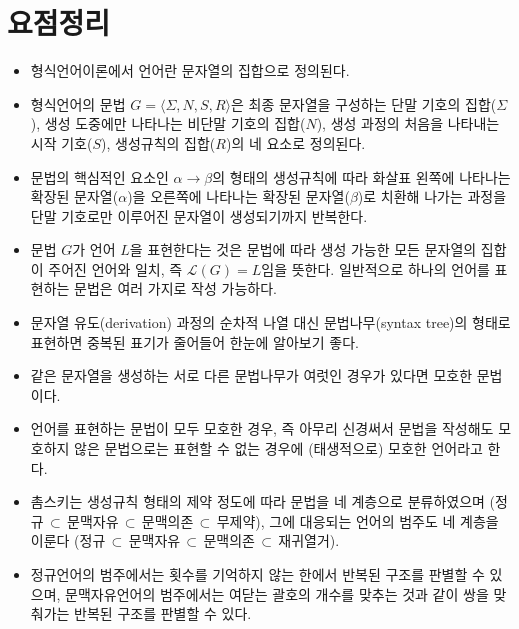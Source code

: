 \section*{요점정리}
\begin{itemize}[itemsep=0pt]
    \item 형식언어이론에서 언어란 문자열의 집합으로 정의된다.
    \item 형식언어의 문법 $G=\langle\Sigma,N,S,R\rangle$은
    최종 문자열을 구성하는 단말 기호의 집합($\Sigma$),
    생성 도중에만 나타나는 비단말 기호의 집합($N$),
    생성 과정의 처음을 나타내는 시작 기호($S$),
    생성규칙의 집합($R$)의 네 요소로 정의된다.
    \item 문법의 핵심적인 요소인 $\alpha\to\beta$의 형태의 생성규칙에 따라
    화살표 왼쪽에 나타나는 확장된 문자열($\alpha$)을 오른쪽에 나타나는
    확장된 문자열($\beta$)로 치환해 나가는 과정을 단말 기호로만 이루어진
    문자열이 생성되기까지 반복한다.
    \item 문법 $G$가 언어 $L$을 표현한다는 것은 문법에 따라 생성 가능한 모든
    문자열의 집합이 주어진 언어와 일치, 즉 $\mathcal{L}(G) = L$임을 뜻한다.
    일반적으로 하나의 언어를 표현하는 문법은 여러 가지로 작성 가능하다.
    \item 문자열 유도(derivation) 과정의 순차적 나열 대신
    문법나무(syntax tree)의 형태로 표현하면 중복된 표기가 줄어들어
    한눈에 알아보기 좋다.
    \item 같은 문자열을 생성하는 서로 다른 문법나무가 여럿인 경우가
    있다면 모호한 문법이다.
    \item 언어를 표현하는 문법이 모두 모호한 경우, 즉 아무리 신경써서
    문법을 작성해도 모호하지 않은 문법으로는 표현할 수 없는 경우에
    (태생적으로) 모호한 언어라고 한다.
    \item 촘스키는 생성규칙 형태의 제약 정도에 따라 문법을 네 계층으로 분류하였으며
    (정규$\,\subset\,$문맥자유$\,\subset\,$문맥의존$\,\subset\,$무제약),
    그에 대응되는 언어의 범주도 네 계층을 이룬다
    (정규$\,\subset\,$문맥자유$\,\subset\,$문맥의존$\,\subset\,$재귀열거).
    \item 정규언어의 범주에서는 횟수를 기억하지 않는 한에서 반복된 구조를
    판별할 수 있으며, 문맥자유언어의 범주에서는 여닫는 괄호의 개수를 맞추는
    것과 같이 쌍을 맞춰가는 반복된 구조를 판별할 수 있다.
\end{itemize}

